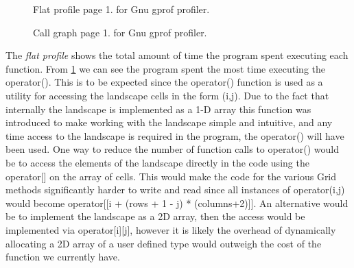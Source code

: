 \begin{figure}
\label{fig:FlatP}
\centering
{}
\caption{Flat profile page 1. for Gnu gprof profiler.}
\end{figure}

\begin{figure}
\label{fig:CallG}
\centering
{}
\caption{Call graph page 1. for Gnu gprof profiler.}
\end{figure}

The \textit{flat profile} shows the total amount of time the program spent executing each function. From \ref{fig:FlatP} we can see the program spent the most time executing the operator(). This is to be expected since the operator() function is used as a utility for accessing the landscape cells in the form (i,j). Due to the fact that internally the landscape is implemented as a 1-D array this function was introduced to make working with the landscape simple and intuitive, and any time access to the landscape is required in the program, the operator() will have been used. One way to reduce the number of function calls to operator() would be to access the elements of the landscape directly in the code using the operator[] on the array of cells. This would make the code for the various Grid methods significantly harder to write and read since all instances of operator(i,j) would become operator[[i + (rows + 1 - j) * (columns+2)]]. An alternative would be to implement the landscape as a 2D array, then the access would be implemented via operator[i][j], however it is likely the overhead of dynamically allocating a 2D array of a user defined type would outweigh the cost of the function we currently have. \\

